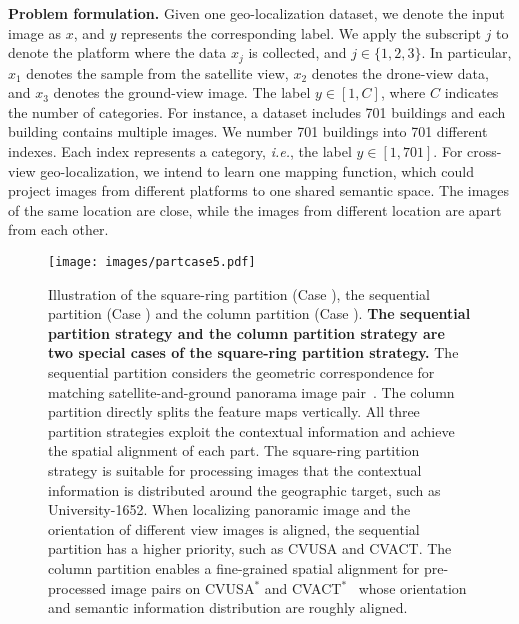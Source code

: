 \documentclass[journal]{IEEEtran}
\def\ie{\emph{i.e.}}
\begin{document}
\textbf{Problem formulation.} Given one geo-localization dataset, we denote the input image as $x$, and $y$ represents the corresponding label. We apply the subscript $j$ to denote the platform where the data $x_j$ is collected, and $j \in \{1, 2, 3\}$. 
In particular, $x_1$ denotes the sample from  the satellite view, $x_2$ denotes the drone-view data, and $x_3$ denotes the ground-view image. The label
$y \in [1, C]$, where $C$ indicates the number of categories. For instance, a dataset includes 701 buildings and each building contains multiple images. We number 701 buildings into 701 different indexes. Each index represents a category, \ie, the label $y \in [1, 701]$. For cross-view geo-localization, we intend to learn one mapping function, which could project images from different platforms to one shared semantic space. The images of the same location are close, while the images from different location are apart from each other. 


\begin{figure}[htbp]
  \centering
  \texttt{[image: images/partcase5.pdf]}
  \caption{Illustration of the square-ring partition (Case \uppercase\expandafter{}), the sequential partition (Case \uppercase\expandafter{}) and the column partition (Case \uppercase\expandafter{}). \textbf{The sequential partition strategy and the column partition strategy are two special cases of the square-ring partition strategy.} The sequential partition considers the geometric correspondence for matching  satellite-and-ground panorama image pair~\cite{shi_spatial-aware_nodate,Shi_2020_CVPR}. The column partition directly splits the feature maps vertically. All three partition strategies exploit the contextual information and achieve the spatial alignment of each part. The square-ring partition strategy is suitable for processing images that the contextual information is distributed around the geographic target, such as University-1652. When localizing panoramic image and the orientation of different view images is aligned, the sequential partition has a higher priority, such as CVUSA and CVACT. The column partition enables a fine-grained spatial alignment for pre-processed image pairs on CVUSA$^*$ and CVACT$^*$~\cite{shi_spatial-aware_nodate,shi_optimal_nodate} whose orientation and semantic information distribution are roughly aligned.
 }
  \label{fig:visual}
\end{figure}
\end{document}
